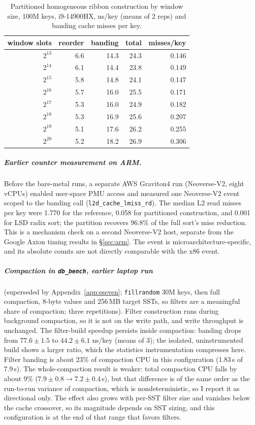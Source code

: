 \documentclass[a4paper,UKenglish,cleveref,autoref,thm-restate,anonymous]{lipics-v2021}
\begin{document}
\begin{table}
\caption{Partitioned homogeneous ribbon construction by window size, 100M keys, i9-14900HX,
ns/key (means of 2 reps) and banding cache misses per key.}
\label{tab:sweep}
\begin{tabular}{rrrrr}
\toprule
window slots & reorder & banding & total & misses/key \\
\midrule
$2^{13}$ & 6.6 & 14.3 & 24.3 & 0.146 \\
$2^{14}$ & 6.1 & 14.4 & 23.8 & 0.149 \\
$2^{15}$ & 5.8 & 14.8 & 24.1 & 0.147 \\
$2^{16}$ & 5.7 & 16.0 & 25.5 & 0.171 \\
$2^{17}$ & 5.3 & 16.0 & 24.9 & 0.182 \\
$2^{18}$ & 5.3 & 16.9 & 25.6 & 0.207 \\
$2^{19}$ & 5.1 & 17.6 & 26.2 & 0.255 \\
$2^{20}$ & 5.2 & 18.2 & 26.9 & 0.306 \\
\bottomrule
\end{tabular}
\end{table}

\subparagraph*{Earlier counter measurement on ARM.} Before the bare-metal runs, a separate AWS Graviton4 run (Neoverse-V2, eight vCPUs) enabled user-space PMU access and measured
one Neoverse-V2 event scoped to the banding call (\texttt{l2d\_cache\_\allowbreak lmiss\_rd}). The median L2 read misses per key were
1.770 for the reference, 0.058 for partitioned construction, and 0.001 for LSD radix sort; the
partition recovers 96.8\% of the full sort's miss reduction. This is a mechanism check on a second
Neoverse-V2 host, separate from the Google Axion timing results in \S\ref{sec:arm}. The event is
microarchitecture-specific, and its absolute counts are not directly comparable with the x86 event.

\subparagraph*{Compaction in \texttt{db\_bench}, earlier laptop run} (superseded by Appendix~\ref{app:eseven}; \texttt{fillrandom} 30M keys, then full
compaction, 8-byte values and 256\,MB target SSTs, so filters are a meaningful share of compaction;
three repetitions). Filter construction runs during
background compaction, so it is not on the write path, and write throughput is unchanged. The
filter-build speedup persists inside
compaction: banding drops from $77.6\pm1.5$ to $44.2\pm6.1$ ns/key (means of 3); the isolated,
uninstrumented build shows a larger ratio, which the statistics
instrumentation compresses here. Filter banding is about 23\% of compaction CPU in this configuration (1.83\,s of
7.9\,s). The whole-compaction
result is weaker: total compaction CPU falls by about 9\% ($7.9\pm0.8 \to 7.2\pm0.4$\,s), but that difference is
of the same order as the run-to-run variance of compaction, which is nondeterministic, so I
report it as directional only. The effect also grows with per-SST filter size and
vanishes below the cache crossover, so its magnitude depends on SST sizing, and this configuration
is at the end of that range that favors filters.
\end{document}
